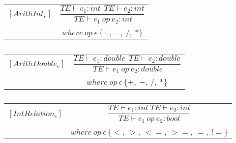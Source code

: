 \begin{table}[H]
    \begin{center}
    \begin{longtable}[c] { r c }
        $[ArithInt_{e}]$ 
        & 
        \( \dfrac{TE \vdash e_{1} :  int \ \ TE \vdash e_{2} : int} 
        {\ TE \vdash e_{1} \ op \ e_{2} : int} \) 
        \\ \\
        & 
        \( {where \ op \ \epsilon \ \{+, \ -, \ /, \ *\} } \)
    \end{longtable}
    \caption{}\label{type:int-arith}
        \end{center}
\end{table}
\begin{table}[H]
    \begin{center}
    \begin{longtable}[c] { r c }
        $[ArithDouble_{e}]$ 
        & 
        \( \dfrac{TE \vdash e_{1} : double \ \ TE \vdash e_{2} :  double} 
        {\ TE \vdash e_{1} \ op \ e_{2} : double} \) 
        \\ \\
        & 
        \( {where \ op \ \epsilon \ \{+, \ -, \ /, \ *\} } \)
    \end{longtable}
    \caption{}\label{type:double-arith}
        \end{center}
\end{table}
\begin{table}[H]
    \begin{center}
    \begin{longtable}[c] { r c }
        $[IntRelation_{e}]$ 
        & 
        \( \dfrac{T E  \vdash  e_1  :  int \ T E  \vdash  e_2  :  int}{T E  \vdash  e_1 \ op \ e_2  :  bool} \) 
        \\ \\
        & 
        \( {where \ op \ \epsilon \ \{<,\ >,\ < =,\ >=,\ =,\ !=\}} \)
    \end{longtable}
    \caption{}\label{type:int-relation}
        \end{center}
\end{table}

